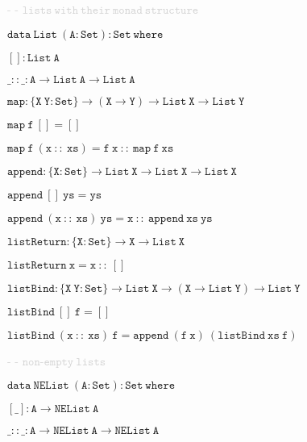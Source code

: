 \vspace{0.25cm}

{\small{\textcolor{lightgray}{- - $\mathtt{lists~with~their~monad~structure}$}}}

{\small{$\mathtt{data ~List ~(A : Set) : Set ~where}$}}

\hspace{0.25cm}
{\small{$\mathtt{[] : List ~A}$}}

\hspace{0.25cm}
{\small{$\mathtt{\_::\!\_ : A \to List ~A \to List ~A}$}}

\newpage

{\small{$\mathtt{map : \{X ~Y : Set\} \to (X \to Y) \to List ~X \to List ~Y}$}}

{\small{$\mathtt{map ~f ~[] = []}$}}

{\small{$\mathtt{map ~f ~(x ~::~ xs) = f ~x ~::~ map ~f ~xs}$}}

\vspace{0.25cm}

{\small{$\mathtt{append : \{X : Set\} \to List ~X \to List ~X \to List ~X}$}}

{\small{$\mathtt{append ~[] ~ys = ys}$}}

{\small{$\mathtt{append ~(x ~::~ xs) ~ys = x ~::~ append ~xs ~ys}$}}

\vspace{0.25cm}

{\small{$\mathtt{listReturn : \{X : Set\} \to X \to List ~X}$}}

{\small{$\mathtt{listReturn ~x = x ~::~ []}$}}

\vspace{0.25cm}

{\small{$\mathtt{listBind : \{X ~Y : Set\} \to List ~X \to (X \to List ~Y) \to List ~Y}$}}

{\small{$\mathtt{listBind ~[] ~f = []}$}}

{\small{$\mathtt{listBind ~(x ~::~ xs) ~f = append ~(f ~x) ~(listBind ~xs ~f)}$}}

\vspace{0.25cm}

{\small{\textcolor{lightgray}{- - $\mathtt{non\text{-}empty ~lists}$}}}

{\small{$\mathtt{data ~NEList ~(A : Set) : Set ~where}$}}

\hspace{0.25cm}
{\small{$\mathtt{[\_] : A \to NEList ~A}$}}

\hspace{0.25cm}
{\small{$\mathtt{\_::\!\_ : A \to NEList ~A \to NEList ~A}$}}

